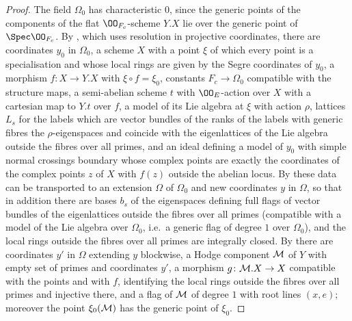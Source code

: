 \begin{proof}
The field $\Omega_0$ has characteristic $0$, since the generic points of the components of the flat
$\OO_{F_c}$-scheme $Y.X$ lie over the generic point of $\Spec\OO_{F_c}$. By
, which uses resolution in projective coordinates, there are
coordinates $y_0$ in $\Omega_0$, a scheme $X$ with a point $\xi$ of which every point is a specialisation and whose
local rings are given by the Segre coordinates of $y_0$, a morphism $f\colon X\to Y.X$ with $\xi\circ f=\xi_0$,
constants $F_c\to\Omega_0$ compatible with the structure maps, a semi-abelian scheme $t$ with $\OO_E$-action
over $X$ with a cartesian map to $Y.t$ over $f$, a model of its Lie algebra at $\xi$ with action $\rho$, lattices
$L_s$ for the labels which are vector bundles of the ranks of the labels with generic fibres the $\rho$-eigenspaces
and coincide with the eigenlattices of the Lie algebra outside the fibres over all primes, and an ideal defining a
model of $y_0$ with simple normal crossings boundary whose complex points are exactly the coordinates of the
complex points $z$ of $X$ with $f(z)$ outside the abelian locus. By
 these data can be transported to an extension $\Omega$ of
$\Omega_0$ and new coordinates $y$ in $\Omega$, so that in addition there are bases $b_s$ of the eigenspaces
defining full flags of vector bundles of the eigenlattices outside the fibres over all primes (compatible with a
model of the Lie algebra over $\Omega_0$, i.e.\ a generic flag of degree $1$ over $\Omega_0$), and the local rings
outside the fibres over all primes are integrally closed. By
 there are coordinates $y'$ in $\Omega$ extending $y$
blockwise, a Hodge component $\mathcal M$ of $Y$ with empty set of primes and coordinates $y'$, a morphism
$g\colon\mathcal M.X\to X$ compatible with the points and with $f$, identifying the local rings outside the fibres
over all primes and injective there, and a flag of $\mathcal M$ of degree $1$ with root lines $(x,e)$; moreover
the point $\xi_0(\mathcal M)$ has the generic point of $\xi_0$.


\end{proof}

